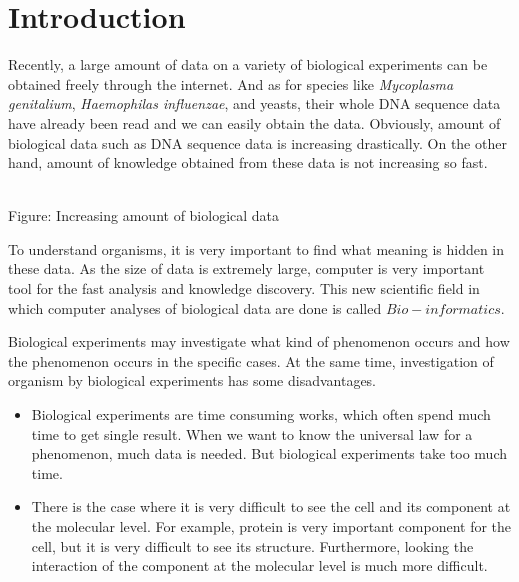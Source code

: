 
\section{Introduction}

Recently, a large amount of data on a variety of biological
experiments can be obtained freely through 
the internet. And as for species like {\it Mycoplasma
genitalium}\cite{label27},  {\it Haemophilas influenzae}, and yeasts, 
their whole DNA sequence data have already been read and we can easily 
obtain the data.
Obviously, amount of biological data such as DNA sequence data is increasing
drastically. On the other hand, amount of knowledge obtained from
these data is not increasing so fast.\\

\begin{center}
\\
Figure: Increasing amount of biological data
\end{center}

To understand organisms, it is very important to 
find what meaning is hidden in these data. As the size of data is extremely
large, computer is very important tool for the fast analysis and knowledge
discovery. This new scientific field in which computer analyses of
biological data are done is called $Bio-informatics$. 

Biological experiments may investigate what kind of phenomenon 
occurs and how the phenomenon occurs in the specific cases. At the
same time, investigation
of organism by biological experiments has some disadvantages.

\begin{itemize}
\item Biological experiments are time consuming works, which often spend much
time to get single result.
When we want to know the universal law for a phenomenon, much data is needed.
But biological experiments take too much time.

\item There is the case where it is very difficult to see the cell and
its component at  
the molecular level. For example, protein is very important component for 
the cell, but it is very difficult to see its structure.
Furthermore, looking the interaction of the component at the molecular level
is much more difficult.

\end{itemize}
 
